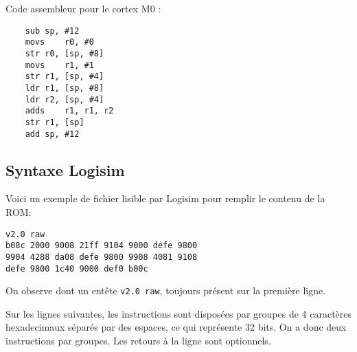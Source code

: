 Code assembleur pour le cortex M0 :
\begin{lstlisting}
	sub	sp, #12
	movs	r0, #0
	str	r0, [sp, #8]
	movs	r1, #1
	str	r1, [sp, #4]
	ldr	r1, [sp, #8]
	ldr	r2, [sp, #4]
	adds	r1, r1, r2
	str	r1, [sp]
	add	sp, #12
\end{lstlisting}

\subsection{Syntaxe Logisim}

Voici un exemple de fichier lisible par Logisim pour remplir le contenu de la ROM:

\begin{lstlisting}
v2.0 raw
b08c 2000 9008 21ff 9104 9000 defe 9800
9904 4288 da08 defe 9800 9908 4081 9108
defe 9800 1c40 9000 def0 b00c
\end{lstlisting}

On observe dont un entête \texttt{v2.0 raw}, toujours présent sur la première ligne.

Sur les lignes suivantes, les instructions sont disposées par groupes de 4 caractères hexadecimaux séparés par des espaces, ce qui représente 32 bits. On a donc deux instructions par groupes. Les retours à la ligne sont optionnels.
